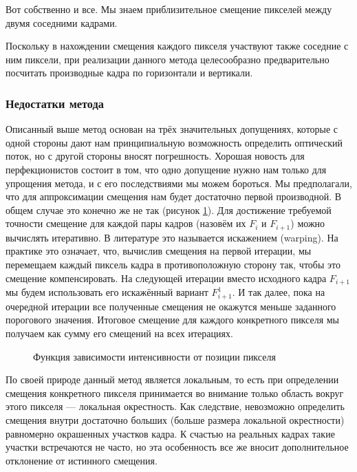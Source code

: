 Вот собственно и все. Мы знаем приблизительное смещение пикселей между двумя соседними кадрами.

Поскольку в нахождении смещения каждого пикселя участвуют также соседние с ним пиксели, при реализации данного метода целесообразно предварительно посчитать производные кадра по горизонтали и вертикали.
\subsubsection{Недостатки метода}

Описанный выше метод основан на трёх значительных допущениях, которые с одной стороны дают нам принципиальную возможность определить оптический поток, но с другой стороны вносят погрешность. Хорошая новость для перфекционистов состоит в том, что одно допущение нужно нам только для упрощения метода, и с его последствиями мы можем бороться. Мы предполагали, что для аппроксимации смещения нам будет достаточно первой производной. В общем случае это конечно же не так (рисунок \ref{pic:math_3}). Для достижение требуемой точности смещение для каждой пары кадров (назовём их $F_i$ и $F_{i+1}$) можно вычислять итеративно. В литературе это называется искажением (warping). На практике это означает, что, вычислив смещения на первой итерации, мы перемещаем каждый пиксель кадра в противоположную сторону так, чтобы это смещение компенсировать. На следующей итерации вместо исходного кадра $F_{i+1}$ мы будем использовать его искажённый вариант $F_{i+1}^1$. И так далее, пока на очередной итерации все полученные смещения не окажутся меньше заданного порогового значения. Итоговое смещение для каждого конкретного пикселя мы получаем как сумму его смещений на всех итерациях.

\begin{figure}[ht]
\caption{Функция зависимости интенсивности от позиции пикселя}
\label{pic:math_3}
\end{figure}

По своей природе данный метод является локальным, то есть при определении смещения конкретного пикселя принимается во внимание только область вокруг этого пикселя — локальная окрестность. Как следствие, невозможно определить смещения внутри достаточно больших (больше размера локальной окрестности) равномерно окрашенных участков кадра. К счастью на реальных кадрах такие участки встречаются не часто, но эта особенность все же вносит дополнительное отклонение от истинного смещения.

